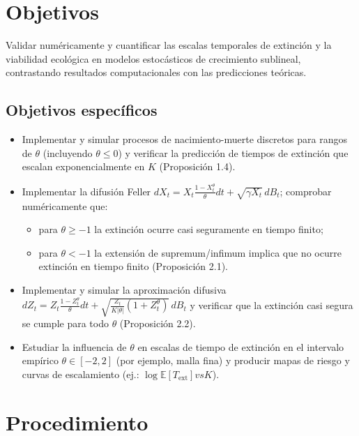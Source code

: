 \documentclass[12pt,]{article}
\begin{document}
\section{Objetivos}

Validar numéricamente y cuantificar las escalas temporales de extinción y la viabilidad ecológica en modelos estocásticos de crecimiento sublineal, contrastando resultados computacionales con las predicciones teóricas.

\subsection{Objetivos específicos}
\begin{itemize}
    \item Implementar y simular procesos de nacimiento-muerte discretos para rangos de $\theta$ (incluyendo $\theta\le 0$) y verificar la predicción de tiempos de extinción que escalan exponencialmente en $K$ (Proposición 1.4).
    \item Implementar la difusión Feller $dX_t = X_t\frac{1-X_t^\theta}{\theta}dt + \sqrt{\gamma X_t}\,dB_t$; comprobar numéricamente que:
    \begin{itemize}
        \item para $\theta\ge -1$ la extinción ocurre casi seguramente en tiempo finito; 
        \item para $\theta < -1$ la extensión de supremum/infimum implica que no ocurre extinción en tiempo finito (Proposición 2.1).
    \end{itemize}
    \item Implementar y simular la aproximación difusiva $dZ_t = Z_t\tfrac{1-Z^\theta_t}{\theta}dt + \sqrt{\tfrac{Z_t}{K|\theta|}(1+Z_t^\theta)}\,dB_t$ y verificar que la extinción casi segura se cumple para todo $\theta$ (Proposición 2.2).
    \item Estudiar la influencia de $\theta$ en escalas de tiempo de extinción en el intervalo empírico $\theta\in[-2,2]$ (por ejemplo, malla fina) y producir mapas de riesgo y curvas de escalamiento (ej.: $\log \mathbb{E}[T_{\mathrm{ext}}] vs K$).
\end{itemize}

\section{Procedimiento}
\end{document}
